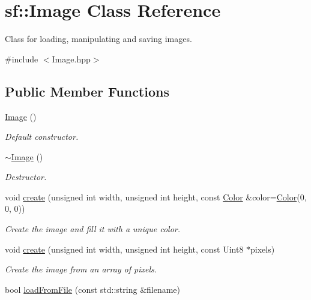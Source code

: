 \hypertarget{classsf_1_1_image}{}\section{sf\+:\+:Image Class Reference}
\label{classsf_1_1_image}


Class for loading, manipulating and saving images.  




{\ttfamily \#include $<$Image.\+hpp$>$}

\subsection*{Public Member Functions}
\begin{DoxyCompactItemize}
\item 
\hyperlink{classsf_1_1_image_abb4caf3cb167b613345ebe36fc883f12}{Image} ()
\begin{DoxyCompactList}\small\item\em Default constructor. \end{DoxyCompactList}\item 
\mbox{\label{classsf_1_1_image_a0ba22a38e6c96e3b37dd88198046de83}} 
\hyperlink{classsf_1_1_image_a0ba22a38e6c96e3b37dd88198046de83}{$\sim$\+Image} ()
\begin{DoxyCompactList}\small\item\em Destructor. \end{DoxyCompactList}\item 
void \hyperlink{classsf_1_1_image_a2a67930e2fd9ad97cf004e918cf5832b}{create} (unsigned int width, unsigned int height, const \hyperlink{classsf_1_1_color}{Color} \&color=\hyperlink{classsf_1_1_color}{Color}(0, 0, 0))
\begin{DoxyCompactList}\small\item\em Create the image and fill it with a unique color. \end{DoxyCompactList}\item 
void \hyperlink{classsf_1_1_image_a1c2b960ea12bdbb29e80934ce5268ebf}{create} (unsigned int width, unsigned int height, const Uint8 $\ast$pixels)
\begin{DoxyCompactList}\small\item\em Create the image from an array of pixels. \end{DoxyCompactList}\item 
bool \hyperlink{classsf_1_1_image_a9e4f2aa8e36d0cabde5ed5a4ef80290b}{load\+From\+File} (const std\+::string \&filename)

\end{DoxyCompactItemize}
